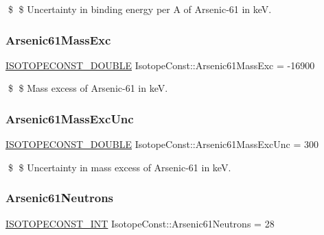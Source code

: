 \$ \$ Uncertainty in binding energy per A of Arsenic-\/61 in keV. \mbox{\label{group___isotope_const-_arsenic-_as61_gaa9b2eea806994a8a41e77c86fbc82c6b}} 
\subsubsection{\texorpdfstring{Arsenic61\+Mass\+Exc}{Arsenic61MassExc}}
{\footnotesize\ttfamily \mbox{\hyperlink{group___isotope_const-_macros_ga8f45a7272ce02c0b4c65c44636ed719a}{I\+S\+O\+T\+O\+P\+E\+C\+O\+N\+S\+T\+\_\+\+D\+O\+U\+B\+LE}} Isotope\+Const\+::\+Arsenic61\+Mass\+Exc = -\/16900}

\$ \$ Mass excess of Arsenic-\/61 in keV. \mbox{\label{group___isotope_const-_arsenic-_as61_gae1184b52e6af30024dee0fb7818397f0}} 
\subsubsection{\texorpdfstring{Arsenic61\+Mass\+Exc\+Unc}{Arsenic61MassExcUnc}}
{\footnotesize\ttfamily \mbox{\hyperlink{group___isotope_const-_macros_ga8f45a7272ce02c0b4c65c44636ed719a}{I\+S\+O\+T\+O\+P\+E\+C\+O\+N\+S\+T\+\_\+\+D\+O\+U\+B\+LE}} Isotope\+Const\+::\+Arsenic61\+Mass\+Exc\+Unc = 300}

\$ \$ Uncertainty in mass excess of Arsenic-\/61 in keV. \mbox{\label{group___isotope_const-_arsenic-_as61_gae851a5805b11c7f25dab586c681d9c60}} 
\subsubsection{\texorpdfstring{Arsenic61\+Neutrons}{Arsenic61Neutrons}}
{\footnotesize\ttfamily \mbox{\hyperlink{group___isotope_const-_macros_ga5f18360b3e99483a35c32d789e62621c}{I\+S\+O\+T\+O\+P\+E\+C\+O\+N\+S\+T\+\_\+\+I\+NT}} Isotope\+Const\+::\+Arsenic61\+Neutrons = 28}

